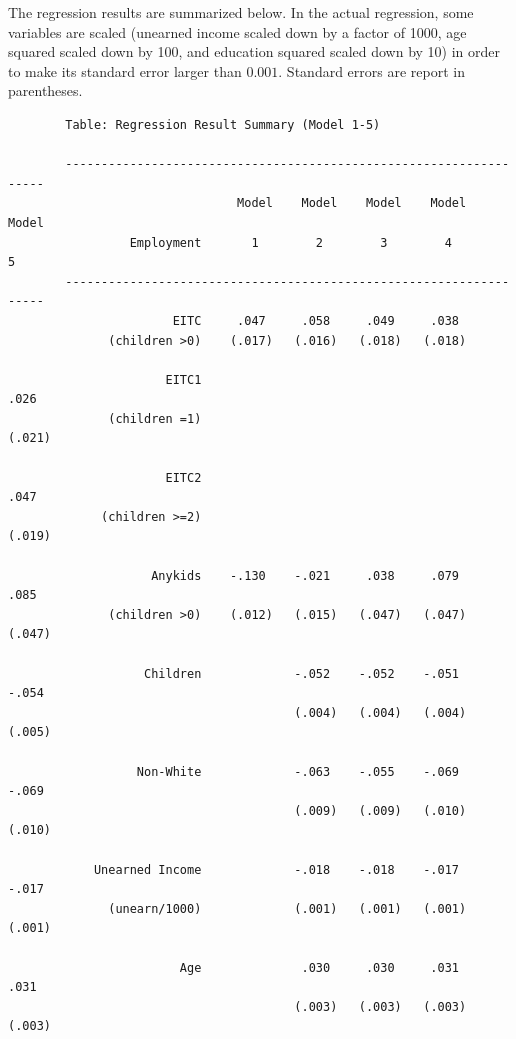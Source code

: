 \documentclass{article}
\begin{document}
\begin{enumerate}
The regression results are summarized below. In the actual regression, some variables are scaled 
(unearned income scaled down by a factor of 1000, age squared scaled down by 100, 
and education squared scaled down by 10) in order to make its standard error larger than $0.001$. 
Standard errors are report in parentheses. 

\newpage

        \begin{verbatim}
        Table: Regression Result Summary (Model 1-5)
        
        -------------------------------------------------------------------
                                Model    Model    Model    Model    Model        
                 Employment       1        2        3        4        5
        -------------------------------------------------------------------
                       EITC     .047     .058     .049     .038         
              (children >0)    (.017)   (.016)   (.018)   (.018)
                            
                      EITC1                                         .026
              (children =1)                                        (.021)
                                                                                 
                      EITC2                                         .047
             (children >=2)                                        (.019)
                            
                    Anykids    -.130    -.021     .038     .079     .085
              (children >0)    (.012)   (.015)   (.047)   (.047)   (.047)
                            
                   Children             -.052    -.052    -.051    -.054
                                        (.004)   (.004)   (.004)   (.005)
                            
                  Non-White             -.063    -.055    -.069    -.069
                                        (.009)   (.009)   (.010)   (.010)
                                         
            Unearned Income             -.018    -.018    -.017    -.017
              (unearn/1000)             (.001)   (.001)   (.001)   (.001)
                                        
                        Age              .030     .030     .031     .031
                                        (.003)   (.003)   (.003)   (.003)
                                       

\end{verbatim}
\end{enumerate}
\end{document}
